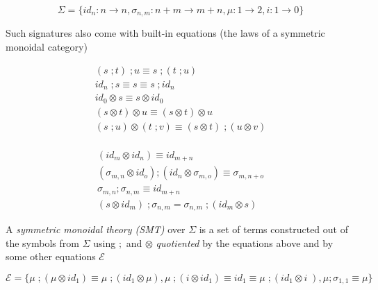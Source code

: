 \documentclass[aspectratio=169]{beamer}
\begin{document}
\begin{frame}{}
  
\small

\[
\Sigma = \{id_n : n \to n,\sigma_{n,m} : n + m \to m + n,\mu : 1 \to 2, i : 1 \to 0\}
\]
 
Such signatures also come with \alert{built-in} equations (the laws of a symmetric monoidal category)


\begin{minipage}[c][][c]{0.45\textwidth}
\begin{align*}    
(s\;;t)\;;u \equiv s\;;(t\;;u)\\
id_{n}\;;s \equiv s \equiv s\;;id_{n}\\
id_{0} \otimes s \equiv s \otimes id_{0}\\
(s \otimes t) \otimes u \equiv (s \otimes t) \otimes u\\
(s\;;u) \otimes (t\;;v) \equiv (s \otimes t)\;;(u \otimes v)\\
\end{align*}
\end{minipage}
\hfill
\begin{minipage}[c][][c]{0.45\textwidth}
\begin{align*}
(id_{m} \otimes id_{n}) \equiv id_{m + n}\\
(\sigma_{m,n} \otimes id_{o});(id_{n} \otimes \sigma_{m,o}) \equiv \sigma_{m,n+o}\\
\sigma_{m,n} ; \sigma_{n,m} \equiv id_{m+n}\\
(s \otimes id_{m})\;; \sigma_{n,m} = \sigma_{n,m}\;; (id_{m} \otimes s)
\end{align*}    
\end{minipage}

\end{frame}

\begin{frame}
    
    A \textit{symmetric monoidal theory (SMT)} over $\Sigma$ is a set of terms constructed out of the symbols from $\Sigma$ using $;$ and $\otimes$ \textit{quotiented} by the equations above and by some other equations $\mathcal{E}$

    \begin{example}
        \[
            \mathcal{E} = \{ \mu \;; (\mu \otimes id_{1}) \equiv \mu \;; (id_{1} \otimes \mu), \mu \;; (i \otimes id_{1}) \equiv id_{1} \equiv \mu\;;(id_{1} \otimes i\;), \mu;\sigma_{1,1} \equiv \mu \}  
        \]
    \end{example}

\end{frame}
\end{document}
